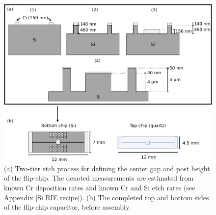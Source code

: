 \documentclass{beavtex_dub_edit}
\begin{document}
\begin{figure}
    \includegraphics[width=1\textwidth]{Two-tier etch.pdf}
    \caption[(a) Two-tier etch process for defining the center gap and post height of the flip-chip. (b) Diagram of the completed top and bottom sides of the flip-chip capacitor, before assembly.]{(a) Two-tier etch process for defining the center gap and post height of the flip-chip. The denoted measurements are estimated from known Cr deposition rates and known Cr and Si etch rates (see Appendix \ref{Si RIE recipe}). (b) The completed top and bottom sides of the flip-chip capacitor, before assembly.}
    \label{twotier}
\end{figure}
\end{document}

